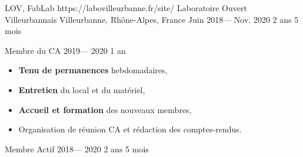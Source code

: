 \volunteerorganization%
{LOV, FabLab}%
{https://labovilleurbanne.fr/site/}%
{Laboratoire Ouvert Villeurbannais}%
{Villeurbanne, Rhône-Alpes, France}%
{Juin 2018--- Nov. 2020}
{2 ans 5 mois}

\volunteerposition%
{Membre du CA}%
{2019--- 2020}%
{1 an}%
{
	\begin{itemize}
		\item \textbf{Tenu de permanences} hebdomadaires,
		\item \textbf{Entretien} du local et du matériel,
		\item \textbf{Accueil et formation} des nouveaux membres,
		\item Organisation de réunion CA et rédaction des comptes-rendus.
	\end{itemize}
}

\volunteerposition%
{Membre Actif}%
{2018--- 2020}
{2 ans 5 mois}
{}
